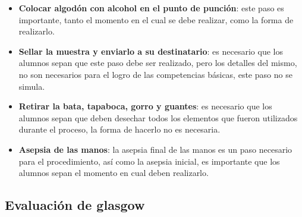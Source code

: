 \begin{itemize}
\item \textbf{Colocar algodón con alcohol en el punto de punción}: este paso es
    importante, tanto el momento en el cual se debe realizar, como la forma de
    realizarlo.

\item \textbf{Sellar la muestra y enviarlo a su destinatario}: es necesario que
    los alumnos sepan que este paso debe ser realizado, pero los detalles del
    mismo, no son necesarios para el logro de las competencias básicas, este
    paso no se simula.

\item \textbf{Retirar la bata, tapaboca, gorro y guantes}: es necesario que los
    alumnos sepan que deben desechar todos los elementos que fueron utilizados
    durante el proceso, la forma de hacerlo no es necesaria.

\item \textbf{Asepsia de las manos}: la asepsia final de las manos es un paso
    necesario para el procedimiento, así como la asepsia inicial, es importante
    que los alumnos sepan el momento en cual deben realizarlo.

\end{itemize}


\subsection{Evaluación de glasgow}
